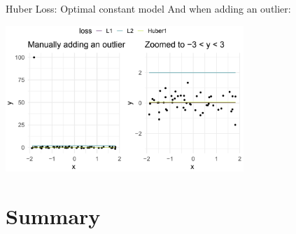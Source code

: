 \begin{vbframe}{Huber Loss: Optimal constant model}
And when adding an outlier: 

\vspace{0.2cm}

\begin{center}
\includegraphics[width = 9cm ]{figure_man/Huber-outlier.png} \\
\end{center}



\end{vbframe}


\section{Summary}

